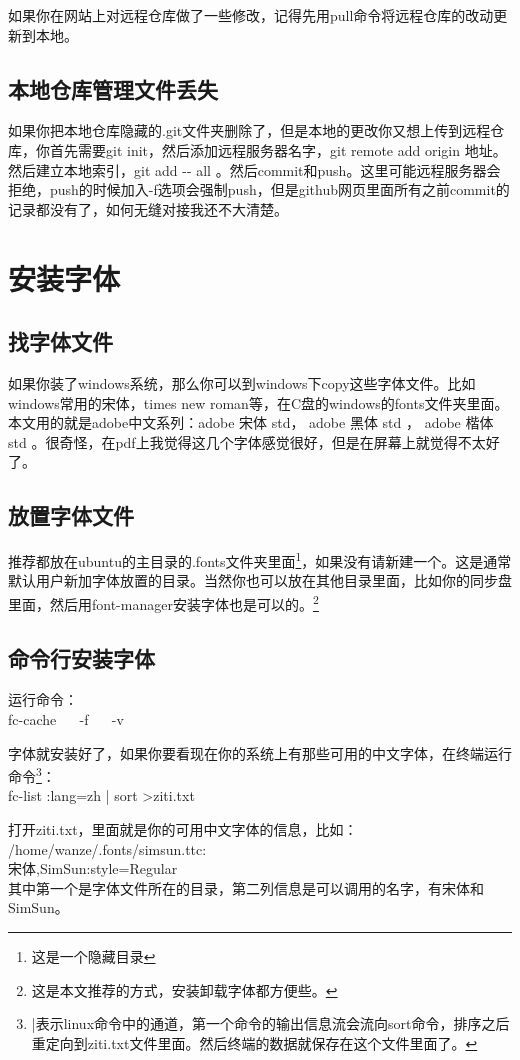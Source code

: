 \documentclass[12pt,oneside]{book}
\begin{document}
\begin{common-format}
如果你在网站上对远程仓库做了一些修改，记得先用pull命令将远程仓库的改动更新到本地。

\subsection{本地仓库管理文件丢失}
如果你把本地仓库隐藏的.git文件夹删除了，但是本地的更改你又想上传到远程仓库，你首先需要git init，然后添加远程服务器名字，git remote add origin 地址。然后建立本地索引，git add -{}- all  。然后commit和push。这里可能远程服务器会拒绝，push的时候加入-f选项会强制push，但是github网页里面所有之前commit的记录都没有了，如何无缝对接我还不大清楚。


\section{安装字体}
\label{sec:安装字体} 
\subsection{找字体文件}
如果你装了windows系统，那么你可以到windows下copy这些字体文件。比如windows常用的宋体，times new roman等，在C盘的windows的fonts文件夹里面。本文用的就是adobe中文系列：adobe 宋体 std， adobe 黑体 std ， adobe 楷体 std 。很奇怪，在pdf上我觉得这几个字体感觉很好，但是在屏幕上就觉得不太好了。

\subsection{放置字体文件}
推荐都放在ubuntu的主目录的.fonts文件夹里面\footnote{这是一个隐藏目录}，如果没有请新建一个。这是通常默认用户新加字体放置的目录。当然你也可以放在其他目录里面，比如你的同步盘里面，然后用font-manager安装字体也是可以的。\footnote{这是本文推荐的方式，安装卸载字体都方便些。}

\subsection{命令行安装字体}
运行命令：\\
fc-cache ~~ -f ~~ -v  

字体就安装好了，如果你要看现在你的系统上有那些可用的中文字体，在终端运行命令\footnote{|表示linux命令中的通道，第一个命令的输出信息流会流向sort命令，排序之后重定向到ziti.txt文件里面。然后终端的数据就保存在这个文件里面了。}：\\
fc-list :lang=zh | sort >ziti.txt 

打开ziti.txt，里面就是你的可用中文字体的信息，比如：\\
/home/wanze/.fonts/simsun.ttc: \\宋体,SimSun:style=Regular \\
其中第一个是字体文件所在的目录，第二列信息是可以调用的名字，有宋体和SimSun。


\end{common-format}
\end{document}
